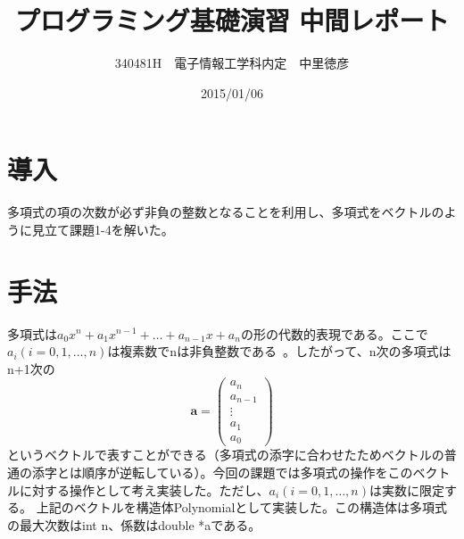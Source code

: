 \documentclass{jsarticle}
\title{プログラミング基礎演習 中間レポート}
\author{340481H　電子情報工学科内定　中里徳彦}
\date{2015/01/06}
\begin{document}
\maketitle

\section{導入}
多項式の項の次数が必ず非負の整数となることを利用し、多項式をベクトルのように見立て課題1-4を解いた。
\section{手法}
多項式は$a_0x^n + a_1x^{n-1}+ \dots + a_{n-1}x + a_n$の形の代数的表現である。ここで$a_i(i = 0, 1, \dots, n)$は複素数でnは非負整数である~\cite{数学}。したがって、n次の多項式はn+1次の
\begin{equation}
\bm{a} = \begin{pmatrix}
	a_n \\
	a_{n-1} \\
	\vdots \\
	a_1 \\
	a_0
\end{pmatrix}
\end{equation}
というベクトルで表すことができる（多項式の添字に合わせたためベクトルの普通の添字とは順序が逆転している）。今回の課題では多項式の操作をこのベクトルに対する操作として考え実装した。ただし、$a_i(i = 0, 1, \dots, n)$は実数に限定する。
上記のベクトルを構造体Polynomialとして実装した。この構造体は多項式の最大次数はint n、係数はdouble *aである。%
\end{document}

